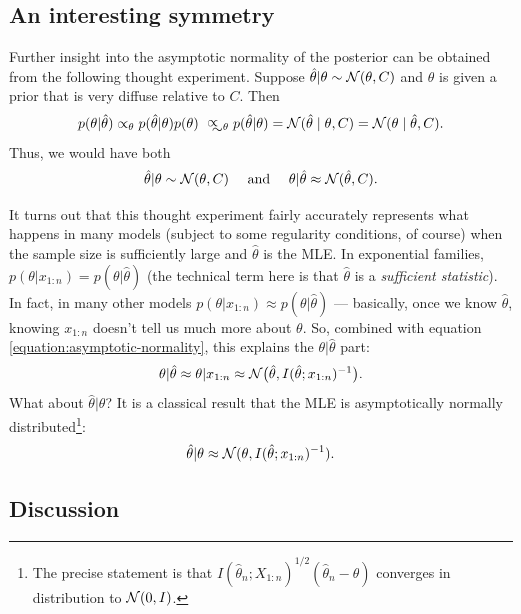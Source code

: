 \documentclass[12pt]{article}
\begin{document}
\subsection{An interesting symmetry}

Further insight into the asymptotic normality of the posterior can be obtained from the following thought experiment.
Suppose $\hat \theta | \theta \sim \mathcal{N}(\theta,C)$ and $\theta$ is given a prior that is very diffuse relative to $C$. Then 
$$ p(\theta | \hat \theta) \propto_\theta p(\hat \theta | \theta) p(\theta)
\approxprop_{\! \! \theta} \; p(\hat \theta | \theta) = \N(\hat\theta \mid \theta,C) = \N(\theta \mid \hat \theta,C).$$
Thus, we would have both
$$ \hat\theta | \theta \sim \mathcal{N}(\theta,C)
\quad \text{ and } \quad \theta | \hat\theta \approx \mathcal{N}(\hat\theta,C). $$

It turns out that this thought experiment fairly accurately represents what happens in many models (subject to some regularity conditions, of course) when the sample size is sufficiently large and $\hat\theta$ is the MLE. In exponential families, $p(\theta | x_{1:n}) = p(\theta | \hat\theta)$ (the technical term here is that $\hat\theta$ is a \textit{sufficient statistic}). 
In fact, in many other models $p(\theta | x_{1:n}) \approx p(\theta | \hat\theta)$ --- basically, once we know $\hat\theta$, knowing $x_{1:n}$ doesn't tell us much more about $\theta$.  So, combined with equation \ref{equation:asymptotic-normality}, this explains the $\theta|\hat\theta$ part:
$$ \theta | \hat\theta \approx \theta | x_{1:n} \approx \mathcal{N} \big(\hat\theta, I(\hat\theta; x_{1:n})^{-1} \big). $$
What about $\hat\theta|\theta$?
It is a classical result that the MLE is asymptotically normally distributed\footnote{The precise statement is that $I(\hat\theta_n; X_{1:n})^{1/2}(\hat\theta_n - \theta)$ converges in distribution to $\mathcal{N}(0,I)$.}:
$$ \hat\theta | \theta \approx \mathcal{N}(\theta,I(\hat\theta; x_{1:n})^{-1}).$$



\subsection{Discussion}
\end{document}
